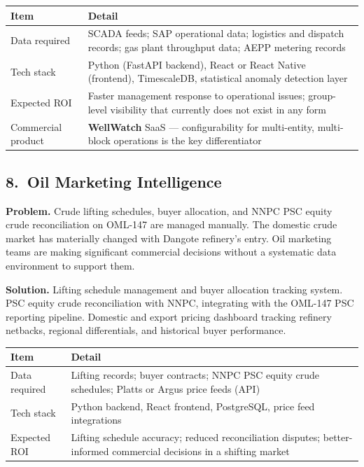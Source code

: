 \documentclass[10pt]{article}
\begin{document}
\vspace{4pt}
\small
\begin{tabularx}{\columnwidth}{@{}lX@{}}
\toprule
\textbf{Item} & \textbf{Detail} \\
\midrule
Data required     & SCADA feeds; SAP operational data; logistics and dispatch records;
                    gas plant throughput data; AEPP metering records \\
Tech stack        & Python (FastAPI backend), React or React Native (frontend),
                    TimescaleDB, statistical anomaly detection layer \\
Expected ROI      & Faster management response to operational issues; group-level
                    visibility that currently does not exist in any form \\
Commercial product & \textbf{WellWatch} SaaS --- configurability for multi-entity,
                    multi-block operations is the key differentiator \\
\bottomrule
\end{tabularx}
\normalsize

\vspace{8pt}

\subsection*{8.\ Oil Marketing Intelligence}

{\small
\textbf{Problem.}
Crude lifting schedules, buyer allocation, and NNPC PSC equity crude reconciliation
on OML-147 are managed manually. The domestic crude market has materially changed with
Dangote refinery's entry. Oil marketing teams are making significant commercial
decisions without a systematic data environment to support them.

\vspace{4pt}
\textbf{Solution.}
Lifting schedule management and buyer allocation tracking system. PSC equity crude
reconciliation with NNPC, integrating with the OML-147 PSC reporting pipeline.
Domestic and export pricing dashboard tracking refinery netbacks, regional differentials,
and historical buyer performance.
}

\vspace{4pt}
\small
\begin{tabularx}{\columnwidth}{@{}lX@{}}
\toprule
\textbf{Item} & \textbf{Detail} \\
\midrule
Data required     & Lifting records; buyer contracts; NNPC PSC equity crude schedules;
                    Platts or Argus price feeds (API) \\
Tech stack        & Python backend, React frontend, PostgreSQL, price feed integrations \\
Expected ROI      & Lifting schedule accuracy; reduced reconciliation disputes;
                    better-informed commercial decisions in a shifting market \\
\bottomrule
\end{tabularx}
\normalsize
\end{document}
